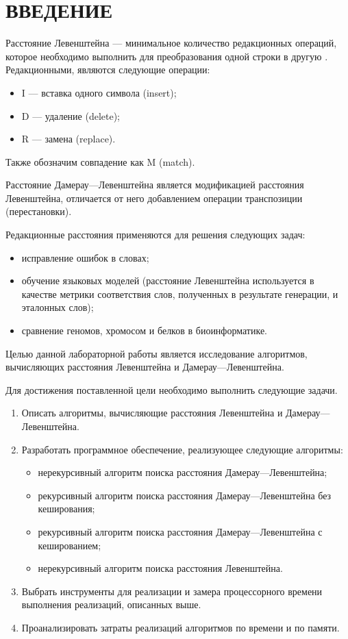 \chapter*{ВВЕДЕНИЕ}

Расстояние Левенштейна --- минимальное количество редакционных операций, которое необходимо выполнить для преобразования одной строки в другую \cite{levenshtein}. Редакционными, являются следующие операции: 
\begin{itemize}
	\item I --- вставка одного символа (insert);
	\item D --- удаление (delete);
	\item R --- замена (replace).
\end{itemize}
Также обозначим совпадение как M (match).

Расстояние Дамерау---Левенштейна является модификацией расстояния Левенштейна, отличается от него добавлением операции транспозиции (перестановки).  

Редакционные расстояния применяются для решения следующих задач:
\begin{itemize}
	\item исправление ошибок в словах;
	\item обучение языковых моделей (расстояние Левенштейна используется в качестве метрики соответствия слов, полученных в результате генерации, и эталонных слов);
	\item сравнение геномов, хромосом и белков в биоинформатике.
\end{itemize}

Целью данной лабораторной работы является исследование алгоритмов, вычисляющих расстояния Левенштейна и Дамерау---Левенштейна.

Для достижения поставленной цели необходимо выполнить следующие задачи.
\begin{enumerate}
	\item Описать алгоритмы, вычисляющие расстояния Левенштейна и Дамерау---Левенштейна.
	\item Разработать программное обеспечение, реализующее следующие алгоритмы:
	\begin{itemize}
		\item нерекурсивный алгоритм поиска расстояния Дамерау---Левенштейна;
		\item рекурсивный алгоритм поиска расстояния Дамерау---Левенштейна без кеширования;
		\item рекурсивный алгоритм поиска расстояния Дамерау---Левенштейна с кешированием;
		\item нерекурсивный алгоритм поиска расстояния Левенштейна.
	\end{itemize}
	\item Выбрать инструменты для реализации и замера процессорного времени выполнения реализаций, описанных выше.
	\item Проанализировать затраты реализаций алгоритмов по времени и по памяти.
\end{enumerate}
